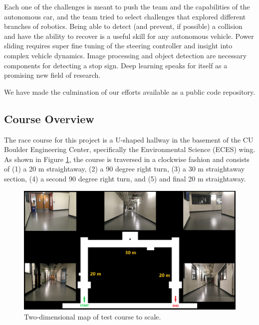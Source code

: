 \documentclass[letterpaper, 10 pt, conference]{ieeeconf}  %
\begin{document}
Each one of the challenges is meant to push the team and the capabilities of the autonomous car, and the team tried to select challenges that explored different branches of robotics. Being able to detect (and prevent, if possible) a collision and have the ability to recover is a useful skill for any autonomous vehicle. Power sliding requires super fine tuning of the steering controller and insight into complex vehicle dynamics. Image processing and object detection are necessary components for detecting a stop sign. Deep learning speaks for itself as a promising new field of research.

We have made the culmination of our efforts available as a public code repository. \cite{HAREproject}

\newpage
\subsection{Course Overview}

The race course for this project is a U-shaped hallway in the basement of the CU Boulder Engineering Center, specifically the Environmental Science (ECES) wing. As shown in Figure \ref{ECCR_basement_map_v2_with_photos_scale}, the course is traversed in a clockwise fashion and consists of (1) a 20 m straightaway, (2) a 90 degree right turn, (3) a 30 m straightaway section, (4) a second 90 degree right turn, and (5) and final 20 m straightaway.

\begin{figure}[h]
\begin{center}
\includegraphics[width=.48\textwidth]{Figures/ECCR_basement_map_v2_with_photos_scale.png}
\caption{Two-dimensional map of test course to scale.}
\label{ECCR_basement_map_v2_with_photos_scale}
\end{center}
\end{figure}
\end{document}
